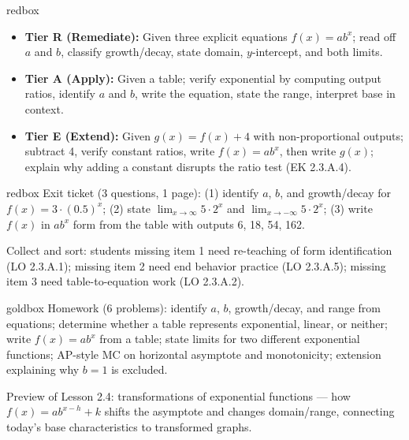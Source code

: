 \documentclass[10pt]{article}
\begin{document}
\begin{skillbox}{redbox}
\begin{itemize}[leftmargin=1.2em,itemsep=2pt,topsep=0pt]
  \item \textbf{Tier R (Remediate):} Given three explicit equations $f(x) = ab^x$; read off $a$
        and $b$, classify growth/decay, state domain, $y$-intercept, and both limits.
  \item \textbf{Tier A (Apply):} Given a table; verify exponential by computing output ratios,
        identify $a$ and $b$, write the equation, state the range, interpret base in context.
  \item \textbf{Tier E (Extend):} Given $g(x) = f(x) + 4$ with non-proportional outputs;
        subtract 4, verify constant ratios, write $f(x) = ab^x$, then write $g(x)$; explain
        why adding a constant disrupts the ratio test (EK 2.3.A.4).
\end{itemize}
\end{skillbox}

\begin{skillbox}{redbox}
Exit ticket (3 questions, 1 page): (1) identify $a$, $b$, and growth/decay for
$f(x) = 3\cdot(0.5)^x$; (2) state $\displaystyle\lim_{x\to\infty} 5\cdot 2^x$ and
$\displaystyle\lim_{x\to-\infty} 5\cdot 2^x$; (3) write $f(x)$ in $ab^x$ form from the
table with outputs 6, 18, 54, 162.

Collect and sort: students missing item 1 need re-teaching of form identification (LO 2.3.A.1);
missing item 2 need end behavior practice (LO 2.3.A.5); missing item 3 need table-to-equation
work (LO 2.3.A.2).
\end{skillbox}

\begin{skillbox}{goldbox}
Homework (6 problems): identify $a$, $b$, growth/decay, and range from equations; determine
whether a table represents exponential, linear, or neither; write $f(x) = ab^x$ from a table;
state limits for two different exponential functions; AP-style MC on horizontal asymptote and
monotonicity; extension explaining why $b = 1$ is excluded.

Preview of Lesson 2.4: transformations of exponential functions --- how $f(x) = ab^{x-h} + k$
shifts the asymptote and changes domain/range, connecting today's base characteristics to
transformed graphs.
\end{skillbox}
\end{document}

